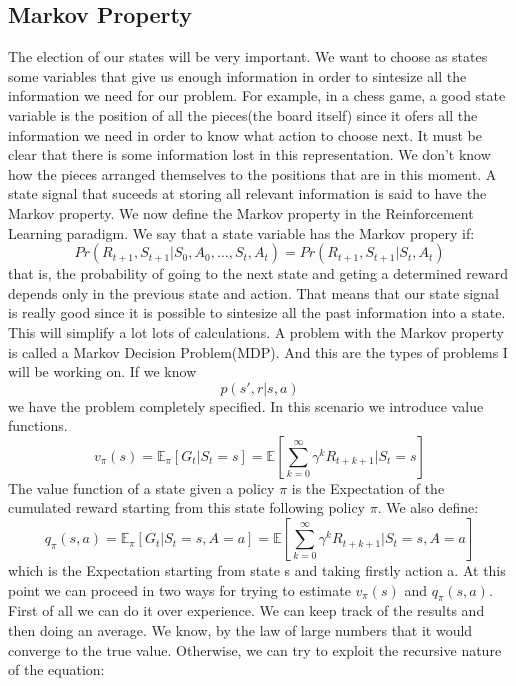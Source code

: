 \documentclass{article}
\begin{document}
\subsection{Markov Property}
The election of our states will be very important. We want to choose as states some variables that give us enough information in order to sintesize all the information we need for our problem. For example, in a chess game, a good state variable is the position of all the pieces(the board itself) since it ofers all the information we need in order to know what action to choose next. It must be clear that there is some information lost in this representation. We don't know how the pieces arranged themselves to the positions that are in this moment.\newline
A state signal that suceeds at storing all relevant information is said to have the Markov property.\newline
We now define the Markov property in the Reinforcement Learning paradigm. We say that a state variable has the Markov propery if:\newline
$$Pr(R_{t+1},S_{t+1}|S_{0},A_{0},\dots,S_{t},A_{t}) = Pr(R_{t+1},S_{t+1}|S_{t},A_{t})$$ that is, the probability of going to the next state and geting a determined reward depends only in the previous state and action. That means that our state signal is really good since it is possible to sintesize all the past information into a state. This will simplify a lot lots of calculations.\newline
A problem with the Markov property is called a Markov Decision Problem(MDP). And this are the types of problems I will be working on. If we know $$p(s',r|s,a)$$ we have the problem completely specified. In this scenario we introduce value functions.\newline
$$v_{\pi}(s) = \mathbb{E}_{\pi}[G_{t}|S_{t} = s] = \mathbb{E}[\sum_{k = 0}^{\infty}\gamma^{k}R_{t+k+1}|S_{t} = s]$$ The value function of a state given a policy $\pi$ is the Expectation of the cumulated reward starting from this state following policy $\pi$. We also define: 
$$q_{\pi}(s,a) = \mathbb{E}_{\pi}[G_{t}|S_{t} = s, A = a] = \mathbb{E}[\sum_{k = 0}^{\infty}\gamma^{k}R_{t+k+1}|S_{t} = s, A = a]$$ which is the Expectation starting from state s and taking firstly action a. At this point we can proceed in two ways for trying to estimate $v_{\pi}(s)$ and $q_{\pi}(s,a)$. First of all we can do it over experience. We can keep track of the results and then doing an average. We know, by the law of large numbers that it would converge to the true value. Otherwise, we can try to exploit the recursive nature of the equation:\newline
\end{document}

